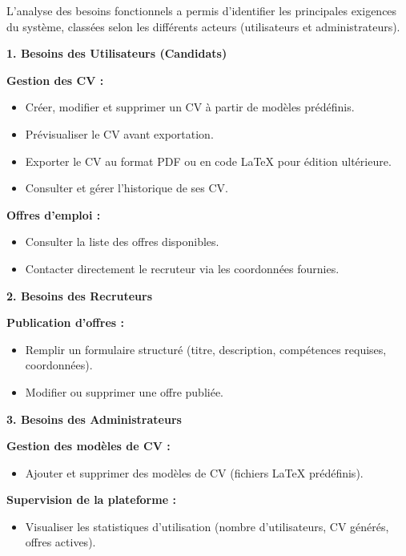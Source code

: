 \documentclass{report}
\begin{document}
L'analyse des besoins fonctionnels a permis d'identifier les principales exigences du système, classées selon les différents acteurs (utilisateurs et administrateurs).

\par

\textbf{1. Besoins des Utilisateurs (Candidats)}

\textbf{Gestion des CV :}
\begin{itemize}
    \item Créer, modifier et supprimer un CV à partir de modèles prédéfinis.
    \item Prévisualiser le CV avant exportation.
    \item Exporter le CV au format PDF ou en code LaTeX pour édition ultérieure.
    \item Consulter et gérer l'historique de ses CV.
\end{itemize}

\par

\textbf{Offres d'emploi :}
\begin{itemize}
    \item Consulter la liste des offres disponibles.
    \item Contacter directement le recruteur via les coordonnées fournies.
\end{itemize}

\par

\textbf{2. Besoins des Recruteurs}

\textbf{Publication d'offres :}
\begin{itemize}
    \item Remplir un formulaire structuré (titre, description, compétences requises, coordonnées).
    \item Modifier ou supprimer une offre publiée.
\end{itemize}

\par

\textbf{3. Besoins des Administrateurs}

\textbf{Gestion des modèles de CV :}
\begin{itemize}
    \item Ajouter et supprimer des modèles de CV (fichiers LaTeX prédéfinis).
\end{itemize}

\par

\textbf{Supervision de la plateforme :}
\begin{itemize}
    \item Visualiser les statistiques d'utilisation (nombre d'utilisateurs, CV générés, offres actives).
\end{itemize}
\end{document}
